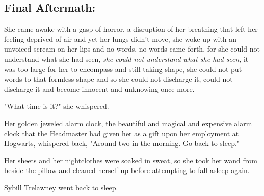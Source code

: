 \subsection{Final Aftermath:}

She came awake with a gasp of horror, a disruption of her breathing that left
her feeling deprived of air and yet her lungs didn't move, she woke up with an
unvoiced scream on her lips and no words, no words came forth, for she could
not understand what she had seen, \emph{she could not understand what she had
seen}, it was too large for her to encompass and still taking shape, she could
not put words to that formless shape and so she could not discharge it, could
not discharge it and become innocent and unknowing once more.

"What time is it?" she whispered.

Her golden jeweled alarm clock, the beautiful and magical and expensive alarm
clock that the Headmaster had given her as a gift upon her employment at
Hogwarts, whispered back, "Around two in the morning. Go back to sleep."

Her sheets and her nightclothes were soaked in sweat, so she took her
wand from beside the pillow and cleaned herself up before attempting
to fall asleep again.

Sybill Trelawney went back to sleep.

